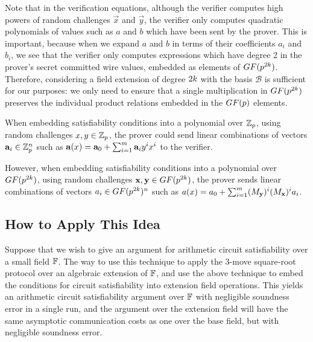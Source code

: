 Note that in the verification equations, although the verifier computes high powers of random challenges $\vec{x}$ and $\vec{y}$, the verifier only computes quadratic polynomials of values such as $a$ and $b$ which have been sent by the prover. This is important, because when we expand $a$ and $b$ in terms of their coefficients $a_i$ and $b_i$, we see that the verifier only computes expressions which have degree 2 in the prover's secret committed wire values, embedded as elements of $GF(p^{2k})$. Therefore, considering a field extension of degree $2k$ with the basis $\mathcal{B}$ is sufficient for our purposes: we only need to ensure that a single multiplication in $GF(p^{2k})$ preserves the individual product relations embedded in the $GF(p)$ elements.

When embedding satisfiability conditions into a polynomial over $\mathbb{Z}_p$, using random challenges $x,y \in \mathbb{Z}_p$, the prover could send linear combinations of vectors $\mathbf{a}_i \in \mathbb{Z}_p^n$ such as $ \mathbf{a}(x)=\mathbf{a}_0 + \sum_{i=1}^m \mathbf{a}_{i}y^i x^{i} $
to the verifier.

However, when embedding satisfiability conditions into a polynomial over $GF(p^{2k})$, using random challenges $\mathbf{x},\mathbf{y} \in GF(p^{2k})$, the prover sends linear combinations of vectors $a_i \in GF(p^{2k})^n$ such as
$ a(x)=a_0 + \sum_{i=1}^m (M_{\mathbf{y}})^i (M_{\mathbf{x}})^i a_{i} $.

\subsection{How to Apply This Idea}

Suppose that we wish to give an argument for arithmetic circuit satisfiability over a small field $\mathbb{F}$. The way to use this technique to apply the 3-move square-root protocol over an algebraic extension of $\mathbb{F}$, and use the above technique to embed the conditions for circuit satisfiability into extension field operations. This yields an arithmetic circuit satisfiability argument over $\mathbb{F}$ with negligible soundness error in a single run, and the argument over the extension field will have the same asymptotic communication costs as one over the base field, but with negligible soundness error.


